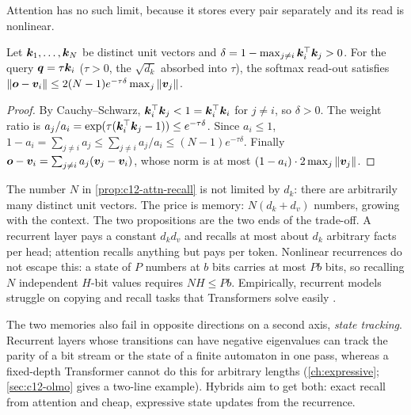 Attention has no such limit, because it stores every pair separately and its read is
nonlinear.

\begin{proposition}\label{prop:c12-attn-recall}
Let $\bm{k}_1,\dots,\bm{k}_N$ be distinct unit vectors and $\delta = 1 - \max_{j\ne i}\bm{k}_i^{\top}\bm{k}_j >
0$. For the query $\bm{q} = \tau\bm{k}_i$ ($\tau>0$, the $\sqrt{d_k}$ absorbed into $\tau$), the
softmax read-out satisfies $\left\lVert \bm{o} - \bm{v}_i\right\rVert \le 2(N-1)e^{-\tau\delta}\max_j\left\lVert \bm{v}_j\right\rVert$.
\end{proposition}
\begin{proof}
By Cauchy--Schwarz, $\bm{k}_i^{\top}\bm{k}_j < 1 = \bm{k}_i^{\top}\bm{k}_i$ for $j\ne i$, so $\delta>0$. The weight
ratio is $a_j/a_i = \exp(\tau(\bm{k}_i^{\top}\bm{k}_j - 1)) \le e^{-\tau\delta}$. Since $a_i\le1$,
$1-a_i = \sum_{j\ne i}a_j \le \sum_{j\ne i}a_j/a_i \le (N-1)e^{-\tau\delta}$. Finally
$\bm{o} - \bm{v}_i = \sum_{j\ne i}a_j(\bm{v}_j - \bm{v}_i)$, whose norm is at most $(1-a_i)\cdot
2\max_j\left\lVert \bm{v}_j\right\rVert$.
\end{proof}

The number $N$ in \cref{prop:c12-attn-recall} is not limited by $d_k$: there are arbitrarily
many distinct unit vectors. The price is memory: $N(d_k+d_v)$ numbers, growing with the
context. The two propositions are the two ends of the trade-off. A recurrent layer pays a
constant $d_kd_v$ and recalls at most about $d_k$ arbitrary facts per head; attention recalls
anything but pays per token. Nonlinear recurrences do not escape this: a state of $P$ numbers
at $b$ bits carries at most $Pb$ bits, so recalling $N$ independent $H$-bit values requires
$NH\le Pb$. Empirically, recurrent models struggle on copying and recall tasks that
Transformers solve easily \citep{c02-jelassi2024repeat,c02-arora2024based}.

The two memories also fail in opposite directions on a second axis, \emph{state tracking}.
Recurrent layers whose transitions can have negative eigenvalues can track the parity of a
bit stream or the state of a finite automaton in one pass, whereas a fixed-depth Transformer
cannot do this for arbitrary lengths (\cref{ch:expressive}; \cref{sec:c12-olmo} gives a
two-line example). Hybrids aim to get both: exact recall from attention and cheap, expressive
state updates from the recurrence.

